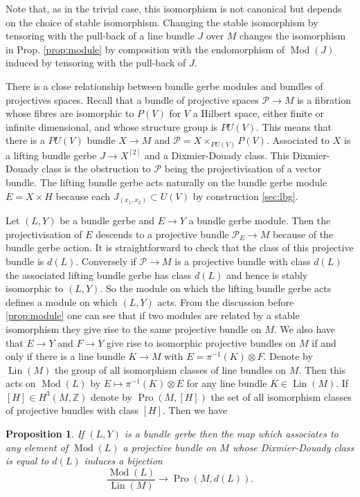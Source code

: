 \documentclass[a4paper,reqno]{amsart}
\DeclareMathOperator{\Mod}{Mod}
\DeclareMathOperator{\Pro}{Pro}
\DeclareMathOperator{\Lin}{Lin}
\theoremstyle{plain}
\newtheorem{proposition}[theorem]{Proposition}
\theoremstyle{definition}
\theoremstyle{remark}
\numberwithin{equation}{section}
\numberwithin{figure}{section}
\newcommand{\cP}{{\mathcal P}}
\newcommand{\ZZ}{{\mathbb Z}}
\newcommand{\<}{\langle}
\renewcommand{\>}{\rangle}
\begin{document}
Note that, as in the trivial case, this isomorphism is not
canonical but depends on the choice of stable isomorphism. Changing the
stable isomorphism by tensoring with the pull-back of a line bundle
$J$ over $M$
changes the isomorphism in Prop.  \ref{prop:module}
by composition with the endomorphism
of $\Mod(J)$ induced by tensoring with the pull-back of $J$.

There is a close relationship between bundle
gerbe modules and bundles of projectives spaces. Recall that a
bundle of projective spaces $\cP \to M$ is a fibration whose fibres
are isomorphic
to $P(V)$ for $V$ a Hilbert space, either finite or infinite dimensional,
and whose structure group is $PU(V)$. This  means that there is a
$PU(V)$ bundle $X \to M$ and $\cP = X \times_{PU(V)} P(V)$.
Associated to $X$ is a
lifting bundle gerbe $J \to X^{[2]}$ and a Dixmier-Douady class.
This Dixmier-Douady class is the obstruction to $\cP$ being the
projectivisation of a vector bundle.  The lifting bundle gerbe acts naturally
on the bundle gerbe module $E = X \times H$ because each $J_{(x_1,
x_2)} \subset U(V)$ by
construction \ref{sec:lbg}.

Let $(L, Y)$ be a
bundle gerbe and $E \to Y$ a bundle gerbe module. Then the projectivisation
of $E$ descends to a projective bundle $\cP_E \to M$ because of the
bundle gerbe action. It is straightforward to check that the class of this
projective bundle is $d(L)$.  Conversely if $\cP \to M$ is a projective
bundle with class $d(L)$ the associated lifting bundle gerbe has class
$d(L)$ and hence is stably isomorphic to $(L, Y)$. So the module on which the
lifting bundle gerbe acts defines a module on which $(L, Y)$ acts.  From the
discussion before \ref{prop:module} one can see that if  two modules
are related
by a stable isomorphism they give rise to the same projective bundle
on $M$.   We also  have that $E \to Y$ and $F \to Y$ give rise to
   isomorphic projective bundles on $M$ if and only if there is a line
bundle $K \to M$ with $E = \pi^{-1}(K)\otimes F$.
Denote by $\Lin(M)$ the group
of all isomorphism classes of line bundles on $M$. Then this acts on
$\Mod(L)$ by $E \mapsto \pi^{-1}(K) \otimes E$ for any line
bundle $K \in \Lin(M)$.  If $[H] \in H^3(M, \ZZ)$ denote
by $\Pro(M, [H])$ the set of all isomorphism classes of
projective bundles with class $[H]$.
Then we have

\begin{proposition}
\label{prop:proj}
If $(L, Y)$ is a bundle gerbe then the  map
which associates to any element of $\Mod(L)$ a projective
bundle on $M$ whose Dixmier-Douady class is equal to $d(L)$ induces
a bijection
$$
\frac{\Mod(L)}{\Lin(M)} \to \Pro(M, d(L)).
$$
\end{proposition}
\end{document}
